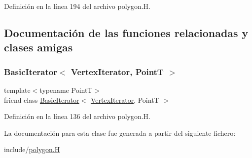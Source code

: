 Definición en la línea 194 del archivo polygon.\+H.



\subsection{Documentación de las funciones relacionadas y clases amigas}
\mbox{\label{class_designar_1_1_gen_polygon_1_1_vertex_iterator_a580630487e8bbe9b1152cc636325bee6}} 
\subsubsection{\texorpdfstring{Basic\+Iterator$<$ Vertex\+Iterator, Point\+T $>$}{BasicIterator< VertexIterator, PointT >}}
{\footnotesize\ttfamily template$<$typename PointT$>$ \\
friend class \hyperlink{class_designar_1_1_basic_iterator}{Basic\+Iterator}$<$ \hyperlink{class_designar_1_1_gen_polygon_1_1_vertex_iterator}{Vertex\+Iterator}, PointT $>$\hspace{0.3cm}{\ttfamily [friend]}}



Definición en la línea 136 del archivo polygon.\+H.



La documentación para esta clase fue generada a partir del siguiente fichero\+:\begin{DoxyCompactItemize}
\item 
include/\hyperlink{polygon_8_h}{polygon.\+H}\end{DoxyCompactItemize}
